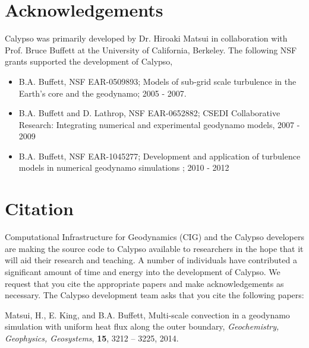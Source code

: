 \section{Acknowledgements}
\label{section:acknowledgements}
Calypso was primarily developed by Dr. Hiroaki Matsui in collaboration with Prof. Bruce Buffett at the University of California, Berkeley. The following NSF grants supported the development of Calypso, 
%
\begin{itemize}
\item B.A. Buffett, NSF EAR-0509893; Models of sub-grid scale turbulence in the Earth's core and the geodynamo; 2005 - 2007.
\item B.A. Buffett and D. Lathrop,  NSF EAR-0652882; CSEDI Collaborative Research: Integrating numerical and experimental geodynamo models, 2007 - 2009
\item B.A. Buffett, NSF EAR-1045277; Development and application of turbulence models in numerical geodynamo simulations ;  2010 - 2012
\end{itemize}
%

\section{Citation}
\label{section:citation}

Computational Infrastructure for Geodynamics (CIG) and the Calypso developers are making the source code to Calypso available to researchers in the hope that it will aid their research and teaching. A number of individuals have contributed a significant amount of time and energy into the development of Calypso. We request that you cite the appropriate papers and make acknowledgements as necessary. The Calypso development team asks that you cite the following papers:

Matsui, H., E. King, and B.A. Buffett, Multi-scale convection in a geodynamo simulation with uniform heat flux along the outer boundary, {\it Geochemistry, Geophysics, Geosystems}, {\bf 15}, 3212 -- 3225, 2014.
